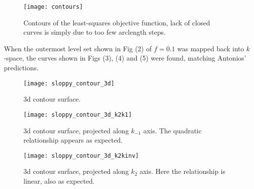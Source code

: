 \documentclass[12pt]{article}
\begin{document}
\begin{figure}[H]
  \texttt{[image: contours]}
  \caption{Contours of the least-squares objective function, lack of closed curves is simply due to too few arclength steps.}
\end{figure}

When the outermost level set shown in Fig (2) of $f = 0.1$ was mapped back into $k$-space, the curves shown in Figs (3), (4) and (5) were found, matching Antonios' predictions. \\

\begin{figure}[H]
  \texttt{[image: sloppy\_contour\_3d]}
  \caption{3d contour surface.}
\end{figure}

\begin{figure}[H]
  \texttt{[image: sloppy\_contour\_3d\_k2k1]}
  \caption{3d contour surface, projected along $k_{-1}$ axis. The quadratic relationship appears as expected.}
\end{figure}

\begin{figure}[H]
  \texttt{[image: sloppy\_contour\_3d\_k2kinv]}
  \caption{3d contour surface, projected along $k_{2}$ axis. Here the relationship is linear, also as expected.}
\end{figure}
\end{document}
